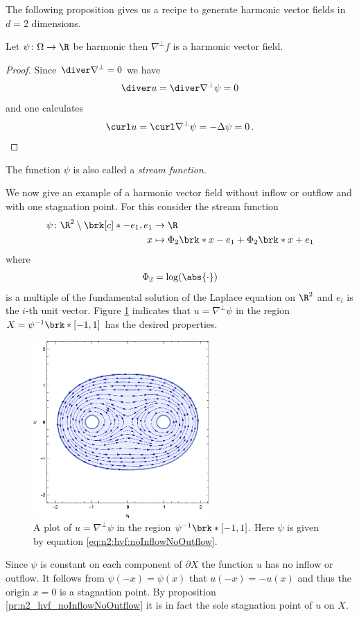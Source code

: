 The following proposition gives us a recipe to generate harmonic vector fields in $d=2$ dimensions.
\begin{proposition}
  Let $\psi\colon\Omega\to\R$ be harmonic then $\nabla^\perp f$ is a harmonic vector field.
\end{proposition} 
\begin{proof}
  Since $\diver \nabla^\perp=0$ we have
  \begin{align*}
    \diver u = \diver\nabla^\perp \psi=0
  \end{align*}
  and one calculates
  \begin{align*}
    \curl u = \curl\nabla^\perp \psi = -\Delta \psi = 0\,.
  \end{align*}
\end{proof}
The function $\psi$ is also called a \emph{stream function}.

We now give an example of a harmonic vector field without 
inflow or outflow and with one stagnation point.
For this consider the stream function
\begin{equation}
  \begin{aligned}
  \psi\colon\R^2\setminus\brk[c]*{-e_1,e_1}&\to\R \\
  x&\mapsto\Phi_2\brk*{x-e_1}+\Phi_2\brk*{x+e_1}
  \end{aligned}\label{eq:n2:hvf:noInflowNoOutflow}
\end{equation}
where
\begin{align*}
  \Phi_2=\log(\abs{\cdot})
\end{align*}
is a multiple of the fundamental solution of the Laplace equation on $\R^2$ and $e_i$ is the $i$-th unit vector.
Figure \ref{pl:n2_hvf_noInflowNoOutflow} indicates that $u=\nabla^\perp\psi$
in the region $X=\psi^{-1}\brk*{[-1,1]}$ has the desired properties.
\begin{figure}
  \centering
  \includegraphics[width=0.6\textwidth]{../Plots/HarmonicVectorFields_gr1.eps}
  \caption{A plot of $u=\nabla^\perp\psi$ in the region $\psi^{-1}\brk*{[-1,1]}$.
    Here $\psi$ is given by equation \eqref{eq:n2:hvf:noInflowNoOutflow}.}
  \label{pl:n2_hvf_noInflowNoOutflow}
\end{figure}
Since $\psi$ is constant on each component of $\partial X$ the function $u$ has 
no inflow or outflow.
It follows from $\psi(-x)=\psi(x)$ that $u(-x)=-u(x)$ 
and thus the origin $x=0$ is a stagnation point.
By proposition \ref{pr:n2_hvf_noInflowNoOutflow} it is in fact the
sole stagnation point of $u$ on $X$.

